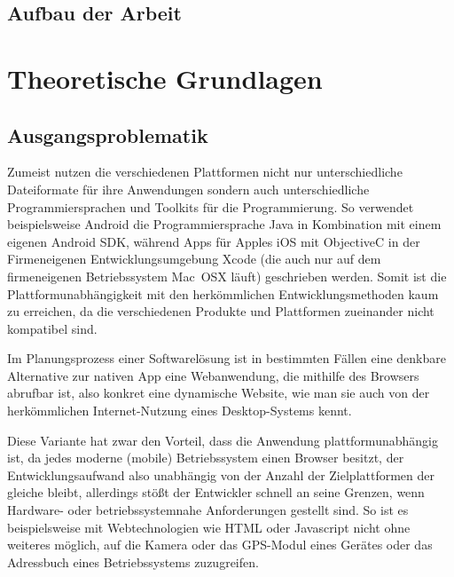 \documentclass{scrreprt}
\begin{document}
\section{Aufbau der Arbeit} %


\chapter{Theoretische Grundlagen}

\section{Ausgangsproblematik}
Zumeist nutzen die verschiedenen Plattformen nicht nur unterschiedliche Dateiformate für ihre Anwendungen sondern auch unterschiedliche Programmiersprachen und Toolkits für die Programmierung. So verwendet beispielsweise Android die Programmiersprache Java in Kombination mit einem eigenen Android SDK, während Apps für Apples iOS mit ObjectiveC in der Firmeneigenen Entwicklungsumgebung Xcode (die auch nur auf dem firmeneigenen Betriebssystem Mac~OSX läuft) geschrieben werden. Somit ist die Plattformunabhängigkeit mit den herkömmlichen Entwicklungsmethoden kaum zu erreichen, da die verschiedenen Produkte und Plattformen zueinander nicht kompatibel sind.

Im Planungsprozess einer Softwarelösung ist in bestimmten Fällen eine denkbare Alternative zur nativen App eine Webanwendung, die mithilfe des Browsers abrufbar ist, also konkret eine dynamische Website, wie man sie auch von der herkömmlichen Internet-Nutzung eines Desktop-Systems kennt. 

Diese Variante hat zwar den Vorteil, dass die Anwendung plattformunabhängig ist, da jedes moderne (mobile) Betriebssystem einen Browser besitzt, der Entwicklungsaufwand also unabhängig von der Anzahl der Zielplattformen der gleiche bleibt, allerdings stößt der Entwickler schnell an seine Grenzen, wenn Hardware- oder betriebssystemnahe Anforderungen gestellt sind. So ist es beispielsweise mit Webtechnologien wie HTML oder Javascript nicht ohne weiteres möglich, auf die Kamera oder das GPS-Modul eines Gerätes oder das Adressbuch eines Betriebssystems zuzugreifen.
\end{document}
